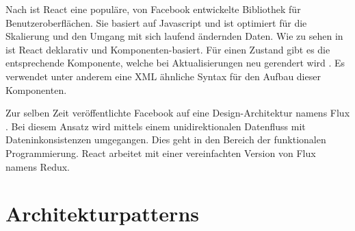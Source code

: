 Nach \cite[S.~11-16]{reactflux} ist React eine populäre, von Facebook entwickelte Bibliothek für Benutzeroberflächen. Sie basiert auf Javascript und ist optimiert für die Skalierung und den Umgang mit sich laufend ändernden Daten. Wie zu sehen in \cite{ReactAJa3:online} ist React deklarativ und Kom\-po\-nent\-en-bas\-iert. Für einen Zustand gibt es die entsprechende Komponente, welche bei Aktualisierungen neu gerendert wird . Es verwendet unter anderem eine XML ähnliche Syntax für den Aufbau dieser Komponenten.

Zur selben Zeit veröffentlichte Facebook auf eine Design-Architektur namens Flux \cite[S.~12]{reactflux}. Bei diesem Ansatz wird mittels einem unidirektionalen Datenfluss mit Dateninkonsistenzen umgegangen. Dies geht in den Bereich der funktionalen Programmierung. React arbeitet mit einer vereinfachten Version von Flux namens Redux.



\section{Architekturpatterns}


